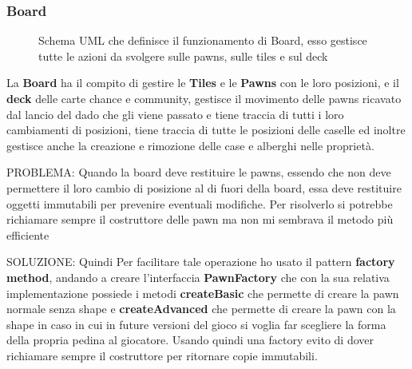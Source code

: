 \subsubsection{Board}
\begin{figure}[H]
    \centering
    \caption{Schema UML che definisce il funzionamento di Board, esso gestisce tutte le azioni da svolgere sulle pawns, sulle tiles e sul deck}
	\label{img:Board}
\end{figure}
La \textbf{Board} ha il compito di gestire le \textbf{Tiles} e le \textbf{Pawns} con le loro posizioni, e il \textbf{deck} delle carte chance e community, 
gestisce il movimento delle pawns ricavato dal lancio del dado che gli viene passato e tiene traccia di tutti i loro cambiamenti di posizioni,
tiene traccia di tutte le posizioni delle caselle ed inoltre gestisce anche la creazione e rimozione delle case e alberghi nelle proprietà.\newline

PROBLEMA:
Quando la board deve restituire le pawns, essendo che non deve permettere il loro cambio di posizione al di fuori della board, 
essa deve restituire oggetti immutabili per prevenire eventuali modifiche. 
Per risolverlo si potrebbe richiamare sempre il costruttore delle pawn ma non mi sembrava il metodo più efficiente \newline

SOLUZIONE:
Quindi Per facilitare tale operazione ho usato il pattern \textbf{factory method}, andando a creare l'interfaccia \textbf{PawnFactory} 
che con la sua relativa implementazione possiede i metodi \textbf{createBasic} che permette di creare la pawn normale senza shape
e \textbf{createAdvanced} che permette di creare la pawn con la shape in caso in cui in future versioni del gioco si voglia far scegliere la forma della propria pedina al giocatore. 
Usando quindi una factory evito di dover richiamare sempre il costruttore per ritornare copie immutabili.\newline

